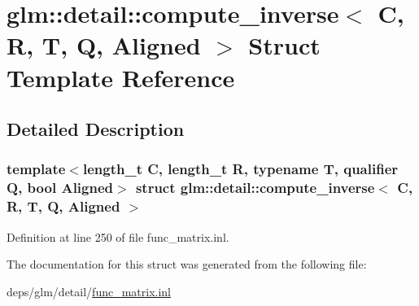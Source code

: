 \hypertarget{structglm_1_1detail_1_1compute__inverse}{}\section{glm\+:\+:detail\+:\+:compute\+\_\+inverse$<$ C, R, T, Q, Aligned $>$ Struct Template Reference}
\label{structglm_1_1detail_1_1compute__inverse}


\subsection{Detailed Description}
\subsubsection*{template$<$length\+\_\+t C, length\+\_\+t R, typename T, qualifier Q, bool Aligned$>$\newline
struct glm\+::detail\+::compute\+\_\+inverse$<$ C, R, T, Q, Aligned $>$}



Definition at line 250 of file func\+\_\+matrix.\+inl.



The documentation for this struct was generated from the following file\+:\begin{DoxyCompactItemize}
\item 
deps/glm/detail/\hyperlink{func__matrix_8inl}{func\+\_\+matrix.\+inl}\end{DoxyCompactItemize}
